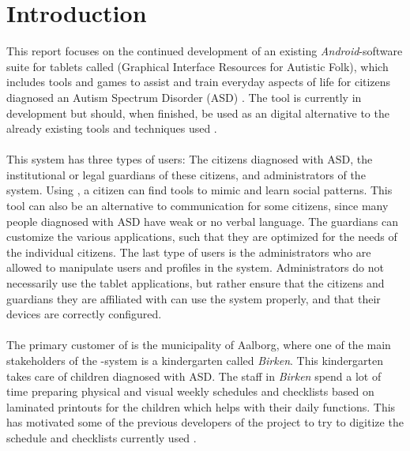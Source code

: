 \chapter{Introduction}
\label{cha:introduction}

This report focuses on the continued development of an existing \emph{Android}-software suite for tablets called \giraf (Graphical Interface Resources for Autistic Folk), which includes tools and games to assist and train everyday aspects of life for citizens diagnosed an Autism Spectrum Disorder (ASD) \parencite{asd}. The tool is currently in development but should, when finished, be used as an digital alternative to the already existing tools and techniques used \parencite{birken_slides}.
\\\\ 
This system has three types of users: The citizens diagnosed with ASD, the institutional or legal guardians of these citizens, and administrators of the system. Using \giraf, a citizen can find tools to mimic and learn social patterns. This tool can also be an alternative to communication for some citizens, since many people diagnosed with ASD have weak or no verbal language. The guardians can customize the various applications, such that they are optimized for the needs of the individual citizens. The last type of users is the administrators who are allowed to manipulate users and profiles in the system. Administrators do not necessarily use the \giraf tablet applications, but rather ensure that the citizens and guardians they are affiliated with can use the system properly, and that their devices are correctly configured.
\\\\
The primary customer of \giraf is the municipality of Aalborg, where one of the main stakeholders of the \giraf-system is a kindergarten called \emph{Birken}. This kindergarten takes care of children diagnosed with ASD. The staff in \emph{Birken} spend a lot of time preparing physical and visual weekly schedules and checklists based on laminated printouts for the children which helps with their daily functions. This has motivated some of the previous developers of the \giraf project to try to digitize the schedule and checklists currently used \parencite{birken_slides}.



